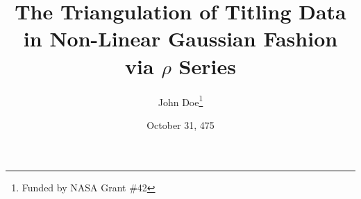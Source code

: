 \documentclass[english,11pt,a4paper]{article}
\begin{document}

\title{The Triangulation of Titling Data in
       Non-Linear Gaussian Fashion via $\rho$ Series}
\date{October 31, 475}
\author{John Doe\thanks{Funded by NASA Grant \#42}}


\maketitle
\end{document}
